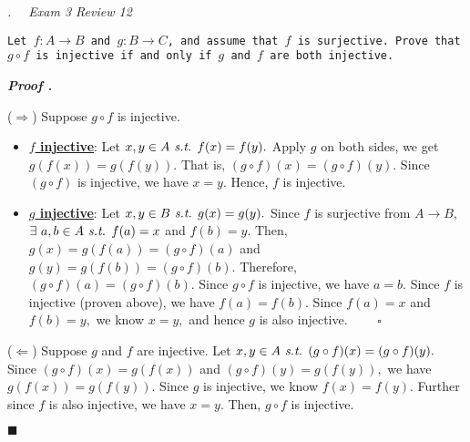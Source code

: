 \documentclass[11pt,letter]{article}
\newcounter{nq}[section]
\newcounter{np}[section]
\newenvironment*{p}{\par\noindent\textbf{\textit{Proof \stepcounter{np}\thenp. }}\par}{\par\hfill $\blacksquare$\par}
\newenvironment*{q}[1]{\noindent\emph{\thesection.\stepcounter{nq}\thenq$\quad $ #1}\par\noindent\texttt}{}
\def\st{\emph{ s.t. }}
\def\of{\circ}
\begin{document}
\begin{framed}\begin{q}
	{Exam 3 Review 12}
	{Let $f:A\to B$ and $g:B\to C$, and assume that $f$ is surjective. Prove that $g\of f$ is injective if and only if $g$ and $f$ are both injective.}
\end{q}\end{framed}
\begin{p}
	($\Rightarrow$) Suppose $g\of f$ is injective.
	\begin{itemize}
		\item \underline{\textbf{$f$ injective}}: Let $x,y\in A\st f(x)=f(y).$ Apply $g$ on both sides, we get $g(f(x))=g(f(y)).$ That is, $(g\of f)(x)=(g\of f)(y).$ Since $(g\of f)$ is injective, we have $x=y.$ Hence, $f$ is injective.
		\item \underline{\textbf{$g$ injective}}: Let $x,y\in B\st g(x)=g(y).$ Since $f$ is surjective from $A\to B,$ $\exists\ a,b\in A\st f(a)=x$ and $f(b)=y.$ Then, $g(x)=g(f(a))=(g\of f)(a)$ and $g(y)=g(f(b))=(g\of f)(b).$ Therefore, $(g\of f)(a)=(g\of f)(b).$ Since $g\of f$ is injective, we have $a=b.$ Since $f$ is injective (proven above), we have $f(a)=f(b).$ Since $f(a)=x$ and $f(b)=y,$ we know $x=y,$ and hence $g$ is also injective. $\qquad\square$
	\end{itemize}
	($\Leftarrow$) Suppose $g$ and $f$ are injective. Let $x,y\in A\st(g\of f)(x)=(g\of f)(y).$ Since $(g\of f)(x)=g(f(x))$ and $(g\of f)(y)=g(f(y)),$ we have $g(f(x))=g(f(y)).$ Since $g$ is injective, we know $f(x)=f(y).$ Further since $f$ is also injective, we have $x=y.$ Then, $g\of f$ is injective. 
\end{p}
\end{document}
